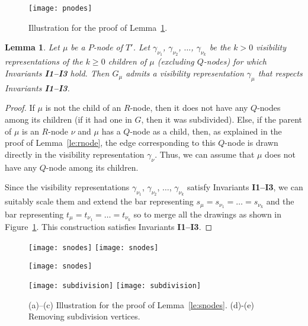 \documentclass{article}
\newtheorem{lemma}{Lemma}
\begin{document}
\begin{figure}[t]
\centering
\texttt{[image: pnodes]}
\caption{ Illustration for the proof of Lemma~\ref{le:pnodes}.}\label{fi:pnodes}
\end{figure}

\begin{lemma}\label{le:pnodes}
Let $\mu$ be a $P$-node of $T'$. Let $\gamma_{\nu_1}$, $\gamma_{\nu_2}$, $\dots$, $\gamma_{\nu_k}$ be the $k > 0$ visibility representations of the $k \geq 0$ children of $\mu$ (excluding $Q$-nodes) for which Invariants {\bf I1--I3} hold. Then $G_\mu$ admits a visibility representation $\gamma_\mu$ that respects Invariants {\bf I1--I3}.
\end{lemma}
\begin{proof}
If $\mu$ is not the child of an $R$-node, then it does not have any $Q$-nodes among its children (if it had one in $G$, then it was subdivided). Else, if the parent of $\mu$ is an $R$-node $\nu$ and $\mu$ has a $Q$-node as a child, then, as explained in the proof of Lemma~\ref{le:rnode}, the edge corresponding to this $Q$-node is drawn directly in the visibility representation $\gamma_\nu$. Thus, we can assume that $\mu$ does not have any $Q$-node among its children.

Since the visibility representations $\gamma_{\nu_1}$, $\gamma_{\nu_2}$, $\dots$, $\gamma_{\nu_k}$ satisfy Invariants {\bf I1--I3}, we can suitably scale them and extend the bar representing $s_\mu =s_{\nu_1}=\dots=s_{\nu_k}$ and the bar representing $t_\mu =t_{\nu_1}=\dots=t_{\nu_k}$ so to merge all the drawings as shown in Figure~\ref{fi:pnodes}. This construction satisfies Invariants {\bf I1--I3}.
\end{proof}

\begin{figure}[t]
    \centering
    \begin{minipage}[b]{.32\textwidth}
    	\centering
    	\texttt{[image: snodes]}
    	\subcaption{}\label{fi:snodes-1}
    	\vspace{1cm}
    	\texttt{[image: snodes]}
    	\subcaption{}\label{fi:snodes-2}
    \end{minipage}
    \hfill
    \begin{minipage}[b]{.32\textwidth}
    	\centering
    	\texttt{[image: snodes]}
    	\subcaption{}\label{fi:snodes-3}
    \end{minipage}
    \begin{minipage}[b]{.32\textwidth}
    	\centering
    	\texttt{[image: subdivision]}
    	\subcaption{}\label{fi:subdivision-1}
    	\vspace{1cm}
    	\texttt{[image: subdivision]}
    	\subcaption{}\label{fi:subdivision-2}
    \end{minipage}
    \caption{ (a)--(c) Illustration for the proof of Lemma~\ref{le:snodes}. (d)-(e) Removing subdivision vertices.}
\end{figure}
\end{document}
